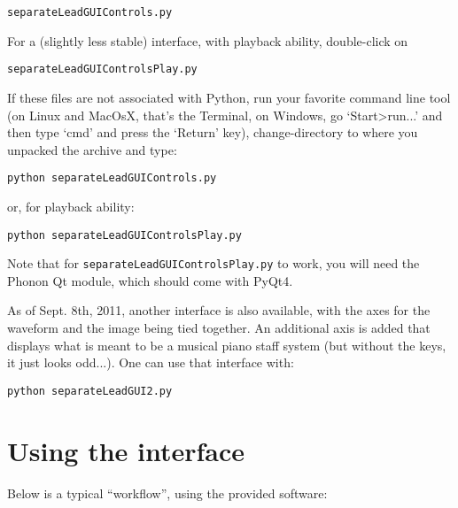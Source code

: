 \documentclass{article}
\begin{document}
\begin{center}
\texttt{separateLeadGUIControls.py}
\end{center}

For a (slightly less stable) interface, with playback ability, double-click on

\begin{center}
\texttt{separateLeadGUIControlsPlay.py}
\end{center}

If these files are not associated with Python, run your favorite command line tool (on Linux and MacOsX, that's the Terminal, on Windows, go `Start>run...' and then type `cmd' and press the `Return' key), change-directory to where you unpacked the archive and type:

\begin{center}
\texttt{python separateLeadGUIControls.py}
\end{center}

or, for playback ability:

\begin{center}
\texttt{python separateLeadGUIControlsPlay.py}
\end{center}

Note that for \texttt{separateLeadGUIControlsPlay.py} to work, you will need the Phonon Qt module, which should come with PyQt4.

As of Sept. 8th, 2011, another interface is also available, with the axes for the waveform and the image being tied together. An additional axis is added that displays what is meant to be a musical piano staff system (but without the keys, it just looks odd...). One can use that interface with:

\begin{center}
\texttt{python separateLeadGUI2.py}
\end{center}

\section{Using the interface}
Below is a typical ``workflow'', using the provided software:
\end{document}

